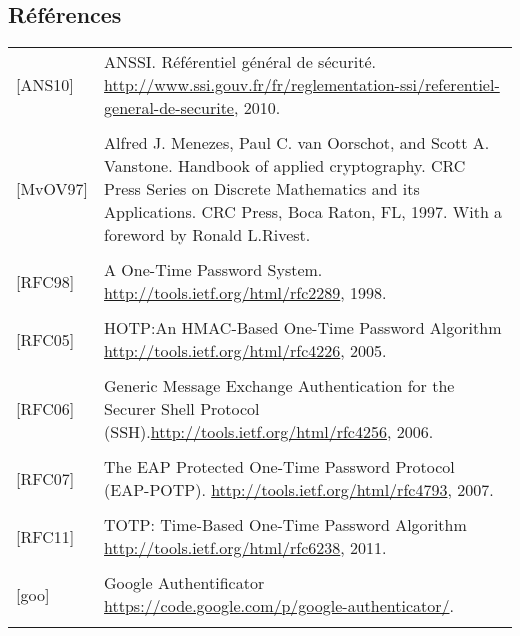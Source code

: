 \documentclass{../../res/univ-projet}
\begin{document}
	\subsection{Références} 
	\begin{tabular}{p{}>{\raggedright\arraybackslash}p{13cm}}
		{[ANS10]} & {ANSSI. Référentiel général de sécurité. \href{http://www.ssi.gouv.fr/fr/reglementation-ssi/referentiel-general-de-securite}{http://www.ssi.gouv.fr/fr/reglementation-ssi/referentiel-general-de-securite}, 2010.}
		\tabularnewline
		\\
		{[MvOV97]} & {Alfred J. Menezes, Paul C. van Oorschot, and Scott A. Vanstone. Handbook of applied cryptography. CRC Press Series on Discrete Mathematics and its Applications. CRC Press, Boca Raton, FL, 1997. With a foreword by Ronald L.Rivest.}
		\tabularnewline
		\\
		{[RFC98]} & {A One-Time Password System. \href{http://tools.ietf.org/html/rfc2289}{http://tools.ietf.org/html/rfc2289}, 1998.}
		\tabularnewline
		\\
		{[RFC05]} & {HOTP:An HMAC-Based One-Time Password Algorithm \href{http://tools.ietf.org/html/rfc4226}{http://tools.ietf.org/html/rfc4226}, 2005.}
		\tabularnewline
		\\
		{[RFC06]} & {Generic Message Exchange Authentication for the Securer Shell Protocol (SSH).\href{http://tools.ietf.org/html/rfc4256}{http://tools.ietf.org/html/rfc4256}, 2006.}
		\tabularnewline
		\\
		{[RFC07]} & {The EAP Protected One-Time Password Protocol (EAP-POTP). \href{http://tools.ietf.org/html/rfc4793}{http://tools.ietf.org/html/rfc4793}, 2007.}
		\tabularnewline
		\\
		{[RFC11]} & {TOTP: Time-Based One-Time Password Algorithm \href{http://tools.ietf.org/html/rfc6238}{http://tools.ietf.org/html/rfc6238}, 2011.}
		\tabularnewline
		\\
		{[goo]} & {Google Authentificator \href{https://code.google.com/p/google-authenticator/}{https://code.google.com/p/google-authenticator/}.}
		\tabularnewline
		\\
	\end{tabular}
\newpage
\end{document}
